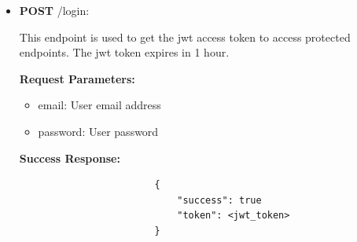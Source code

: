 \documentclass[12pt]{article}
\begin{document}
\begin{itemize}
             \item \textbf{POST} /login:
                \begin{addmargin}[1em]{2em}%
                    This endpoint is used to get the jwt access token to access protected endpoints. The jwt token expires in 1 hour.
                    \par\textbf{Request Parameters:}
                    \begin{itemize}
                        \item email: User email address
                        \item password: User password
                    \end{itemize}
                    \par\textbf{Success Response:}
                    \begin{listing}[H]
                    \begin{verbatim}
                        {     
                            "success": true
                            "token": <jwt_token>
                        }
                    \end{verbatim}
                    \end{listing}
                \end{addmargin}


\end{itemize}
\end{document}

